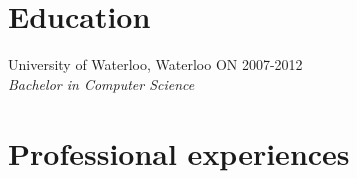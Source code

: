 \documentclass{res}
\newcommand{\inFrench}[1]{}
\newcommand{\inEnglish}[1]{#1}
\begin{document}
\begin{resume}
\section{Education}
\vspace{4pt}

\inFrench{
	Université de Waterloo, Waterloo ON
	\hfill 2007-2012 \\
	{\sl Baccalauréat en science informatiquel}
}
\inEnglish{
	University of Waterloo, Waterloo ON
	\hfill 2007-2012 \\
	{\sl Bachelor in Computer Science}
}


\inFrench{
	\section{Expériences professionnelles}
}
\inEnglish{
	\section{Professional experiences}
}
\vspace{6pt}


\end{resume}
\end{document}
